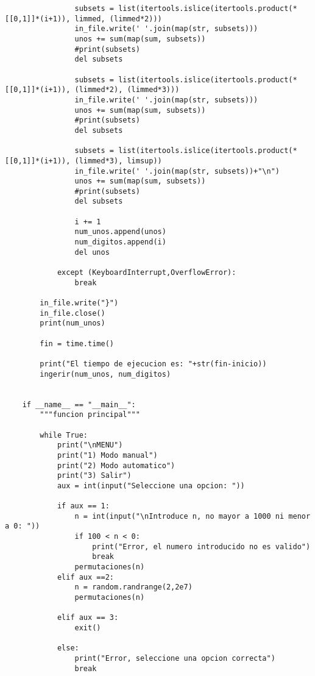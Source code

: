 \documentclass{article}
\begin{document}
\begin{lstlisting}
                subsets = list(itertools.islice(itertools.product(*[[0,1]]*(i+1)), limmed, (limmed*2)))
                in_file.write(' '.join(map(str, subsets)))
                unos += sum(map(sum, subsets))
                #print(subsets)
                del subsets
                
                subsets = list(itertools.islice(itertools.product(*[[0,1]]*(i+1)), (limmed*2), (limmed*3)))
                in_file.write(' '.join(map(str, subsets)))
                unos += sum(map(sum, subsets))
                #print(subsets)
                del subsets
                
                subsets = list(itertools.islice(itertools.product(*[[0,1]]*(i+1)), (limmed*3), limsup))
                in_file.write(' '.join(map(str, subsets))+"\n")
                unos += sum(map(sum, subsets))
                #print(subsets)
                del subsets
                
                i += 1
                num_unos.append(unos)  
                num_digitos.append(i)     
                del unos
                
            except (KeyboardInterrupt,OverflowError):
                break
        
        in_file.write("}")
        in_file.close()
        print(num_unos)
        
        fin = time.time()
        
        print("El tiempo de ejecucion es: "+str(fin-inicio))
        ingerir(num_unos, num_digitos)
            
                
    if __name__ == "__main__":
        """funcion principal"""
        
        while True:
            print("\nMENU")
            print("1) Modo manual")
            print("2) Modo automatico")
            print("3) Salir")
            aux = int(input("Seleccione una opcion: "))
                
            if aux == 1:
                n = int(input("\nIntroduce n, no mayor a 1000 ni menor a 0: "))
                if 100 < n < 0:
                    print("Error, el numero introducido no es valido")
                    break
                permutaciones(n)
            elif aux ==2:
                n = random.randrange(2,2e7)
                permutaciones(n)
                
            elif aux == 3:
                exit()    
            
            else:
                print("Error, seleccione una opcion correcta")
                break
\end{lstlisting}
\end{document}
